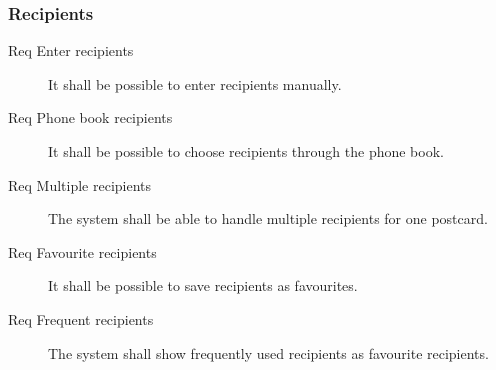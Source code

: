 \documentclass[10pt,a4paper]{article}
\begin{document}
\subsubsection{Recipients}
\begin{description}
\item [Req  Enter recipients] It shall be possible to enter recipients manually.
\item [Req  Phone book recipients] It shall be possible to choose recipients through the phone book.
\item [Req  Multiple recipients] The system shall be able to handle multiple recipients for one postcard.
\item [Req  Favourite recipients] It shall be possible to save recipients as favourites.
\item [Req  Frequent recipients] The system shall show frequently used recipients as favourite recipients.
\end{description}
\end{document}
